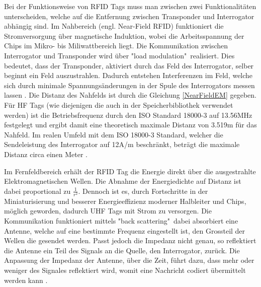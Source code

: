 Bei der Funktionsweise von \gls{RFID} Tags muss man zwischen zwei Funktionalitäten unterscheiden, welche auf die Entfernung zwischen Transponder und Interrogator abhängig sind. Im Nahbereich (engl. Near-Field \gls{RFID}) funktioniert die Stromversorgung über magnetische Induktion, wobei die Arbeitsspannung der Chips im Mikro- bis Miliwattbereich liegt. Die Kommunikation zwischen Interrogator und Transponder wird über "load modulation"\ realisiert. Dies bedeutet, dass der Transponder, aktiviert durch das Feld des Interrogator, selber beginnt ein Feld auszustrahlen. Dadurch entstehen Interferenzen im Feld, welche sich durch minimale Spannungsänderungen in der Spule des Interrogators messen lassen \parencite{want2006}. Die Distanz des Nahfelds ist durch die Gleichung \ref{NearFieldEM} gegeben. Für \gls{HF} Tags (wie diejenigen die auch in der Speicherbibliothek verwendet werden) ist die Betriebsfrequenz durch den ISO Standard 18000-3 auf 13.56MHz festgelegt und ergibt damit eine theoretisch maximale Distanz von 3.519m für das Nahfeld. Im realen Umfeld mit dem ISO 18000-3 Standard, welcher die Sendeleistung des Interrogator auf 12A/m beschränkt, beträgt die maximale Distanz circa einen Meter \parencite{ISO18000-3}.


Im Fernfeldbereich erhält der \gls{RFID} Tag die Energie direkt über die ausgestrahlte Elektromagnetischen Wellen. Die Abnahme der Energiedichte auf Distanz ist dabei proportional zu $\frac{1}{r^2}$. Dennoch ist es, durch Fortschritte in der Miniaturisierung und besserer Energieeffizienz moderner Halbleiter und Chips, möglich geworden, dadurch \gls{UHF} Tags mit Strom zu versorgen. 
Die Kommunikation funktioniert mittels "back scattering"\, dabei absorbiert eine Antenne, welche auf eine bestimmte Frequenz eingestellt ist, den Grossteil der Wellen die gesendet werden. Passt jedoch die Impedanz nicht genau, so reflektiert die Antenne ein Teil des Signals an die Quelle, den Interrogator, zurück. Die Anpassung der Impedanz der Antenne, über die Zeit, führt dazu, dass mehr oder weniger des Signales reflektiert wird, womit eine Nachricht codiert übermittelt werden kann \parencite{want2006}.


